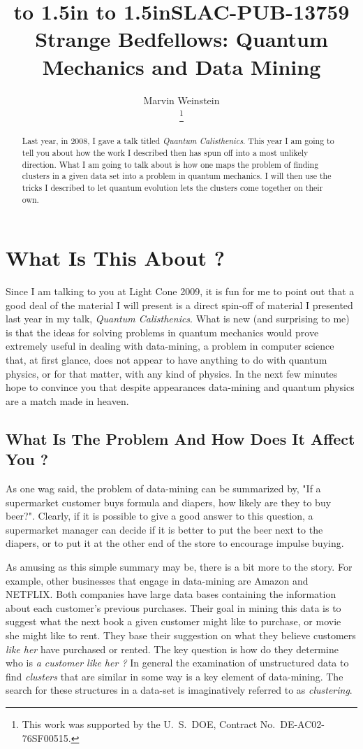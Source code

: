 \documentclass[fleqn,twoside]{article}
\title{\noindent\hfill\hbox to 1.5in{\rm  } \vskip 1pt \noindent\hfill\hbox
to 1.5in{\rm SLAC-PUB-13759 \hfill  } \vskip 1pt
\vskip 10pt
Strange Bedfellows:  Quantum Mechanics and Data Mining}
\author{Marvin Weinstein\address[SLAC]{SLAC National Accelerator Laboratory,\\
        Stanford, CA, USA}%
        \thanks{This work was supported by the U.~S.~DOE, Contract No.~DE-AC02-76SF00515.}}
\begin{document}
\begin{abstract}
Last year, in 2008, I gave a talk titled {\it Quantum Calisthenics\/}.  This
year I am going to tell you about how the work I described then has spun off
into a most unlikely direction.  What I am going to talk about is how one
maps the problem of finding clusters in a given data set into a problem in
quantum mechanics.  I will then use the tricks I described to let quantum
evolution lets the clusters come together on their own.
\vspace{1pc}
\end{abstract}

\maketitle

\section{What Is This About ?}

Since I am talking to you at Light Cone 2009, it is fun for me
to point out that a good deal of the material I will present is a
direct spin-off of material I presented last year in my talk,
{\it Quantum Calisthenics\/}.  What is new (and surprising to me)
is that the ideas for solving problems in quantum mechanics would prove
extremely useful in dealing with data-mining, a problem in computer
science that, at first glance, does not appear to have anything to
do with quantum physics, or for that matter, with any kind of physics.
In the next few minutes hope to convince you that despite
appearances data-mining and quantum physics are a match made in heaven.

\subsection{What Is The Problem And How Does It Affect You ?}

As one wag said, the problem of data-mining can be summarized by,
"If a supermarket customer buys formula and diapers,
how likely are they to buy beer?".  Clearly, if it is possible to
give a good answer to this question, a supermarket manager
can decide if it is better to put the beer next to the diapers, or
to put it at the other end of the store to encourage impulse buying.

As amusing as this simple summary may be, there is a bit more to the
story. For example, other businesses that engage in data-mining are
Amazon and NETFLIX.  Both companies have large data bases containing
the information about each customer's previous purchases.  Their
goal in mining this data is to suggest what the
next book a given customer might like to purchase, or movie she
might like to rent.  They base their suggestion on what
they believe customers {\it like her\/} have purchased or rented.
The key question is how do they determine who is {\it a customer
like her ?}  In general the examination of unstructured data to find
{\it clusters\/} that are similar in some
way is a key element of data-mining.  The search for these
structures in a data-set is imaginatively referred to as
{\it clustering\/}.
\end{document}
